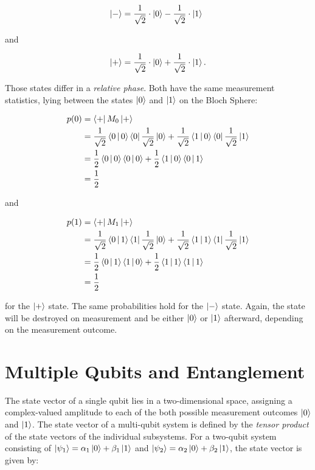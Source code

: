 \begin{equation}
  \Ket{-} = \frac{1}{\sqrt{2}} \cdot \Ket{0} - \frac{1}{\sqrt{2}} \cdot \Ket{1} \phantom{.}
\end{equation}

and

\begin{equation}
  \Ket{+} = \frac{1}{\sqrt{2}} \cdot \Ket{0} + \frac{1}{\sqrt{2}} \cdot \Ket{1}.
\end{equation}

Those states differ in a \textit{relative phase}. Both have the same measurement statistics, lying between the states $\Ket{0}$ and
$\Ket{1}$ on the Bloch Sphere:

\begin{align}
  p(0) &= \Bra{+} M_0 \Ket{+} \\
       &= \frac{1}{\sqrt{2}} \Braket{0|0} \Bra{0} \frac{1}{\sqrt{2}} \Ket{0} + \frac{1}{\sqrt{2}} \Braket{1|0} \Bra{0} \frac{1}{\sqrt{2}} \Ket{1} \\
       &= \frac{1}{2} \Braket{0|0} \Braket{0|0} + \frac{1}{2} \Braket{1|0} \Braket{0|1} \\
       &= \frac{1}{2}
\end{align}


and

\begin{align}
  p(1) &= \Bra{+} M_1 \Ket{+} \\
       &= \frac{1}{\sqrt{2}} \Braket{0|1} \Bra{1} \frac{1}{\sqrt{2}} \Ket{0} + \frac{1}{\sqrt{2}} \Braket{1|1} \Bra{1} \frac{1}{\sqrt{2}} \Ket{1} \\
       &= \frac{1}{2} \Braket{0|1} \Braket{1|0} + \frac{1}{2} \Braket{1|1} \Braket{1|1} \\
       &= \frac{1}{2}
\end{align}



for the $\Ket{+}$ state. The same probabilities hold for the
$\Ket{-}$ state.
Again, the state will be destroyed on measurement and be either $\Ket{0}$ or $\Ket{1}$ afterward, depending on the measurement outcome.

\section{Multiple Qubits and Entanglement}
\label{sec:multiplequbitsandentanglement}

The state vector of a single qubit lies in a two-dimensional 
space, assigning a complex-valued amplitude to each of the both possible measurement outcomes
$\Ket{0}$ and $\Ket{1}$. The state vector of a multi-qubit system is defined by
the \textit{tensor product} of the state vectors of the individual subsystems.
For a two-qubit system consisting of $\Ket{\psi_1} = \alpha_1 \Ket{0} + \beta_1
\Ket{1}$ and $\Ket{\psi_2} = \alpha_2 \Ket{0} + \beta_2 \Ket{1}$, the state vector
is given by:

